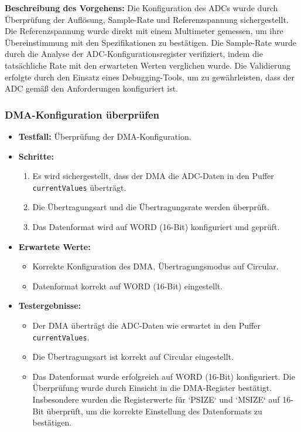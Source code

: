 \textbf{Beschreibung des Vorgehens:}
Die Konfiguration des ADCs wurde durch Überprüfung der Auflösung, Sample-Rate und Referenzspannung sichergestellt. Die Referenzspannung wurde direkt mit einem Multimeter gemessen, um ihre Übereinstimmung mit den Spezifikationen zu bestätigen. Die Sample-Rate wurde durch die Analyse der ADC-Konfigurationsregister verifiziert, indem die tatsächliche Rate mit den erwarteten Werten verglichen wurde. Die Validierung erfolgte durch den Einsatz eines Debugging-Tools, um zu gewährleisten, dass der ADC gemäß den Anforderungen konfiguriert ist.


\subsubsection{DMA-Konfiguration überprüfen}
\begin{itemize}
	\item \textbf{Testfall:} Überprüfung der DMA-Konfiguration.
	\item \textbf{Schritte:}
	\begin{enumerate}
		\item Es wird sichergestellt, dass der DMA die ADC-Daten in den Puffer \texttt{currentValues} überträgt.
		\item Die Übertragungsart und die Übertragungsrate werden überprüft.
		\item Das Datenformat wird auf WORD (16-Bit) konfiguriert und geprüft.
	\end{enumerate}
	\item \textbf{Erwartete Werte:}
	\begin{itemize}
		\item Korrekte Konfiguration des DMA, Übertragungsmodus auf Circular.
		\item Datenformat korrekt auf WORD (16-Bit) eingestellt.
	\end{itemize}
	\item \textbf{Testergebnisse:}
	\begin{itemize}
		\item Der DMA überträgt die ADC-Daten wie erwartet in den Puffer \texttt{currentValues}.
		\item Die Übertragungsart ist korrekt auf Circular eingestellt.
		\item Das Datenformat wurde erfolgreich auf WORD (16-Bit) konfiguriert. Die Überprüfung wurde durch Einsicht in die DMA-Register bestätigt. Insbesondere wurden die Registerwerte für `PSIZE` und `MSIZE` auf 16-Bit überprüft, um die korrekte Einstellung des Datenformats zu bestätigen.
	\end{itemize}
\end{itemize}


